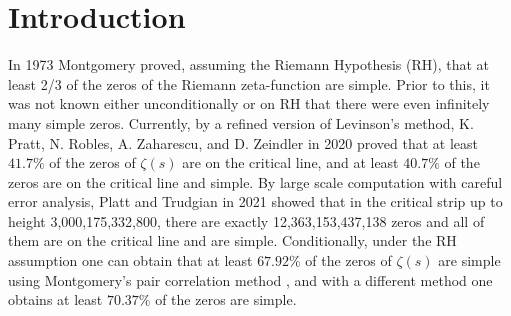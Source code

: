 \documentclass[11pt]{amsart}
\theoremstyle{remark}
\theoremstyle{plain}
\numberwithin{equation}{section}
\begin{document}




\section{Introduction}

In 1973 Montgomery \cite{Montgomery73} proved, assuming the Riemann Hypothesis (RH), that at least 2/3 of the zeros of the Riemann zeta-function are simple. Prior to this, it was not known either unconditionally or on RH that there were even infinitely many simple zeros. Currently, by a refined version of Levinson's method, K. Pratt, N. Robles, A. Zaharescu, and D. Zeindler \cite{Pra20} in 2020 proved that at least $41.7\%$ of the zeros of $\zeta(s)$ are on the critical line, and at least $40.7\%$ of the zeros are on the critical line and simple. By large scale computation with careful error analysis, Platt and Trudgian \cite{PlaTru21} in 2021 showed that in the critical strip up to height 3,000,175,332,800, there are exactly 12,363,153,437,138 zeros and all of them are on the critical line and are simple. Conditionally, under the RH assumption one can obtain that at least $67.92\%$ of the zeros of $\zeta(s)$ are simple using Montgomery's pair correlation method \cite{CGL2020}, and with a different method \cite{CGG98,BuiHB} one obtains at least $70.37\%$ of the zeros are simple.

\end{document}
